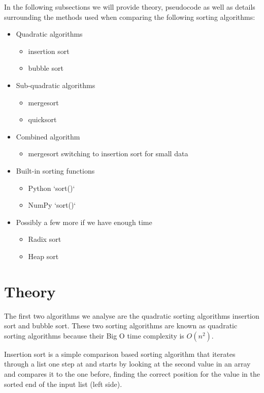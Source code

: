 \documentclass[sigconf, nonacm, natbib, screen, balance=False]{acmart}
\begin{document}
In the following subsections we will provide theory, pseudocode as well as details surrounding the methods used when comparing the following sorting algorithms: 
\begin{itemize}
\item Quadratic algorithms
  \begin{itemize}
  \item insertion sort
  \item bubble sort
  \end{itemize}
\item Sub-quadratic algorithms
  \begin{itemize}
  \item mergesort
  \item quicksort
  \end{itemize}
\item Combined algorithm
  \begin{itemize}
  \item mergesort switching to insertion sort for small data
  \end{itemize}
\item Built-in sorting functions
  \begin{itemize}
  \item Python `sort()`
  \item NumPy `sort()`
  \end{itemize}
\item Possibly a few more if we have enough time
  \begin{itemize}
  \item Radix sort
  \item Heap sort
  \end{itemize}
\end{itemize}

\section{Theory}\label{sec:theory}

The first two algorithms we analyse are the quadratic sorting algorithms insertion sort and bubble sort. These two sorting algorithms are known as quadratic sorting algorithms because their Big O time complexity is $O(n^2)$.

Insertion sort is a simple comparison based sorting algorithm that iterates through a list one step at and starts by looking at the second value in an array and compares it to the one before, finding the correct position for the value in the sorted end of the input list (left side).
\end{document}
